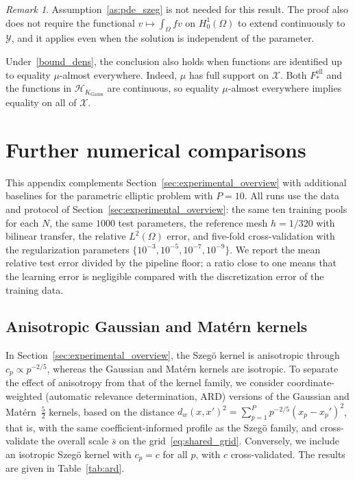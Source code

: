 \documentclass[11pt]{article}
\numberwithin{equation}{section}
\theoremstyle{plain}
\theoremstyle{definition}
\theoremstyle{remark}
\newtheorem{remark}[theorem]{Remark}
\newcommand{\X}{\mathcal{X}}
\newcommand{\Hs}{\mathcal{H}}
\newcommand{\Y}{\mathcal{Y}}
\begin{document}
\begin{remark}
\label{rem:ell_gaussian_nonmembership_scope}
Assumption~\ref{as:pde_szeg} is not needed for this result. The proof
also does not require the functional $v\mapsto\int_\Omega fv$ on
$H_0^1(\Omega)$ to extend continuously to $\Y$, and it applies even
when the solution is independent of the parameter.

Under~\eqref{bound_dens}, the conclusion also holds when functions
are identified up to equality $\mu$-almost everywhere. Indeed,
$\mu$ has full support on $\X$. Both
$F_*^{\mathrm{ell}}$ and the functions in $\Hs_{K_{\mathrm{Gauss}}}$
are continuous, so equality $\mu$-almost everywhere implies equality
on all of $\X$.
\end{remark}

\section{Further numerical comparisons}
\label{app:further_experiments}

This appendix complements Section~\ref{sec:experimental_overview} with additional baselines
for the parametric elliptic problem with $P=10$. All runs use the data and protocol of
Section~\ref{sec:experimental_overview}: the same ten training pools for each $N$, the same
$1000$ test parameters, the reference mesh $h=1/320$ with bilinear transfer, the relative
$L^2(\Omega)$ error, and five-fold cross-validation with the regularization parameters
$\{10^{-3},10^{-5},10^{-7},10^{-9}\}$. We report the mean relative test error divided by the
pipeline floor; a ratio close to one means that the learning error is negligible compared
with the discretization error of the training data.

\subsection{Anisotropic Gaussian and Matérn kernels}

In Section~\ref{sec:experimental_overview}, the Szegö kernel is anisotropic through
$c_p\propto p^{-2/5}$, whereas the Gaussian and Matérn kernels are isotropic. To separate the
effect of anisotropy from that of the kernel family, we consider coordinate-weighted
(automatic relevance determination, ARD) versions of the Gaussian and Matérn~$\tfrac52$
kernels, based on the distance
$d_w(x,x')^2=\sum_{p=1}^P p^{-2/5}(x_p-x_p')^2$, that is, with the same
coefficient-informed profile as the Szegö family, and cross-validate the overall scale
$\bar s$ on the grid~\eqref{eq:shared_grid}. Conversely, we include an isotropic Szegö
kernel with $c_p=c$ for all $p$, with $c$ cross-validated. The results are given in
Table~\ref{tab:ard}.
\end{document}
